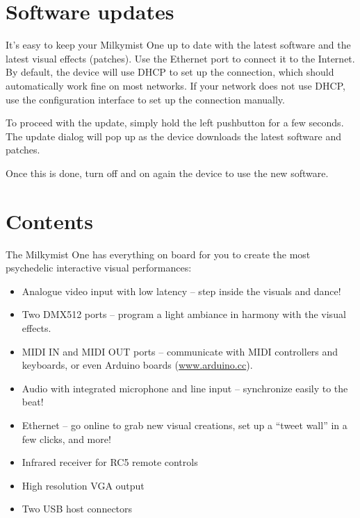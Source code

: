 \documentclass{leaflet}
\begin{document}
\section{Software updates}
It's easy to keep your Milkymist One up to date with the latest software and the latest visual effects (patches). Use the Ethernet port to connect it to the Internet. By default, the device will use DHCP to set up the connection, which should automatically work fine on most networks. If your network does not use DHCP, use the configuration interface to set up the connection manually.

To proceed with the update, simply hold the left pushbutton for a few seconds. The update dialog will pop up as the device downloads the latest software and patches.

Once this is done, turn off and on again the device to use the new software.

\section{Contents}
The Milkymist One has everything on board for you to create the most psychedelic interactive visual performances:
\begin{itemize}
\item Analogue video input with low latency -- step inside the visuals and dance!
\item Two DMX512 ports -- program a light ambiance in harmony with the visual effects.
\item MIDI IN and MIDI OUT ports -- communicate with MIDI controllers and keyboards, or even Arduino boards (\url{www.arduino.cc}).
\item Audio with integrated microphone and line input -- synchronize easily to the beat!
\item Ethernet -- go online to grab new visual creations, set up a ``tweet wall'' in a few clicks, and more!
\item Infrared receiver for RC5 remote controls
\item High resolution VGA output
\item Two USB host connectors
\end{itemize}
\end{document}
